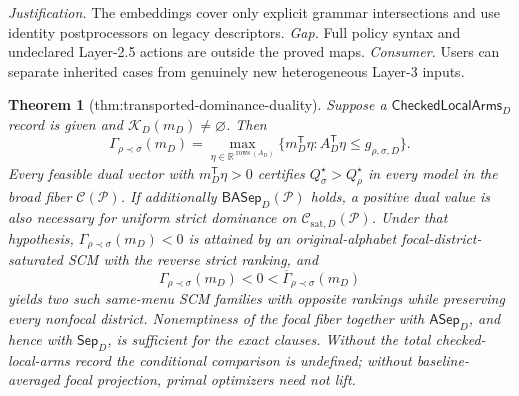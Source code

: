 \documentclass{article}
\newtheorem{theorem}{Theorem}
\begin{document}
\par\smallskip\noindent \textit{Justification.} The embeddings cover only explicit grammar intersections and use identity postprocessors on legacy descriptors. \textit{Gap.} Full policy syntax and undeclared Layer-2.5 actions are outside the proved maps. \textit{Consumer.} Users can separate inherited cases from genuinely new heterogeneous Layer-3 inputs.

\begin{theorem}[thm:transported-dominance-duality]\label{thm:transported-dominance-duality}
Suppose a \(\mathsf{CheckedLocalArms}_D\) record is given and \(\mathcal K_D(m_D)\ne\varnothing\).  Then
\[
\Gamma_{\rho\prec\sigma}(m_D)=
\max_{\eta\in\mathbb R^{\operatorname{rows}(A_D)}}
\{m_D^{\mathsf T}\eta:A_D^{\mathsf T}\eta
\leq g_{\rho,\sigma,D}\}.
\]
Every feasible dual vector with \(m_D^{\mathsf T}\eta>0\) certifies \(Q_\sigma^\star>Q_\rho^\star\) in every model in the broad fiber \(\mathcal C(\mathcal P)\).  If additionally \(\mathsf{BASep}_D(\mathcal P)\) holds, a positive dual value is also necessary for uniform strict dominance on \(\mathcal C_{\mathrm{sat},D}(\mathcal P)\).  Under that hypothesis, \(\Gamma_{\rho\prec\sigma}(m_D)<0\) is attained by an original-alphabet focal-district-saturated SCM with the reverse strict ranking, and
\[
\Gamma_{\rho\prec\sigma}(m_D)<0<
\overline\Gamma_{\rho\prec\sigma}(m_D)
\]
yields two such same-menu SCM families with opposite rankings while preserving every nonfocal district.  Nonemptiness of the focal fiber together with \(\mathsf{ASep}_D\), and hence with \(\mathsf{Sep}_D\), is sufficient for the exact clauses.  Without the total checked-local-arms record the conditional comparison is undefined; without baseline-averaged focal projection, primal optimizers need not lift.
\end{theorem}
\end{document}
